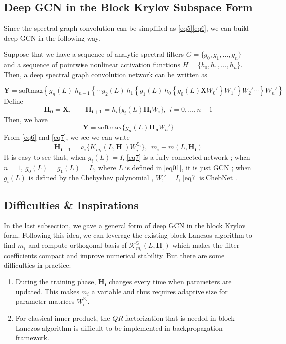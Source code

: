 \documentclass{article}
\begin{document}
\subsection{Deep GCN in the Block Krylov Subspace Form}
\label{deep_gcn_krylov}
Since the spectral graph convolution can be simplified as \eqref{eq5}\eqref{eq6}, we can build deep GCN in the following way.

Suppose that we have a sequence of analytic spectral filters $G=\{ g_0, g_1, \dots, g_n\}$ and a sequence of pointwise nonlinear activation functions $H = \{h_0, h_1,\dots, h_n \}$. Then, a deep spectral graph convolution network can be written as

\begin{equation} \label{eq7}
\textbf{Y} = \mbox{softmax} \left\lbrace g_n(L) \; h_{n-1} \left\lbrace  \cdots g_2(L) \; h_1\left\lbrace g_1(L) \; h_0 \left\{ g_0(L) \bm{X} W_0' \right\} W_1' \right\rbrace  W_2' \cdots \right\rbrace W_n' \right\rbrace
\end{equation}
Define
$$
\bm{H_0}=\bm{X}, \qquad \bm{H_{i+1}}=h_{i} \{ g_i(L) \bm{H_i} W_i\}, \ \ i = 0, \dots,n-1
$$
Then, we have
$$
\bm{Y}=\mbox{softmax}\{ g_n(L)\bm{H_n} W_n' \}
$$
From \eqref{eq6} and \eqref{eq7}, we see we can write
$$
\bm{H_{i+1}} = h_{i} \{K_{m_i} (L,\bm{H_i}) W_i^{\mathbb{S}_i}\}, \ \ m_i \equiv m(L,\bm{H_i})
$$
It is easy to see that, when $g_i(L) = I$, \eqref{eq7} is a fully connected network \cite{li2018deeper};
when $n=1$, $g_0(L) = g_1(L)= L$, where $L$ is defined in \eqref{eq01}, it is just GCN \cite{kipf2016classification}; when $g_i(L)$ is defined by the Chebyshev polynomial \cite{hammond2011wavelets}, $W_i' = I$, \eqref{eq7} is ChebNet \cite{defferrard2016fast}.

\subsection{Difficulties \& Inspirations}
\label{difficulty}
In the last subsection, we gave a general form of deep GCN in the block Krylov form. Following this idea, we can leverage the existing block Lanczos  algorithm \cite{frommer2017block, frommer2017radau} to find $m_i$ and compute orthogonal basis of $\mathcal{K}_{m_i}^{\mathbb{S}} (L,\bm{H_i})$ which makes the filter coefficients compact \cite{liao2019lanczos} and improve numerical stability. But there are some difficulties in practice:
\begin{enumerate}[leftmargin=12pt]
\item During the training phase, $\bm{H_i}$ changes every time when parameters are updated. This makes $m_i$ a variable and thus requires adaptive size for parameter matrices $W_i^{\mathbb{S}_i}$.
\item %
For classical inner product, the $QR$ factorization that is needed in block Lanczos algorithm \cite{frommer2017block} is difficult to be implemented in backpropagation framework.
\end{enumerate}
\end{document}
